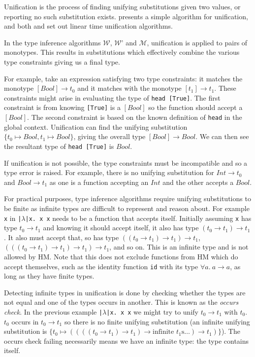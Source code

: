 \documentclass[a4paper,fleqn,oneside,12pt]{report}
\newcommand{\W}{$\mathcal{W}$}
\newcommand{\M}{$\mathcal{M}$}
\begin{document}
Unification is the process of finding unifying substitutions given two values, or reporting no such substitution exists. \cite{ref29} presents a simple algorithm for unification, and both \cite{ref30} and \cite{ref31} set out linear time unification algorithms.

In the type inference algorithms \W, \W’ and \M, unification is applied to pairs of monotypes. This results in substitutions which effectively combine the various type constraints giving us a final type.

For example, take an expression satisfying two type constraints: it matches the monotype $[Bool] \rightarrow t_0$ and it matches with the monotype $[t_1] \rightarrow t_1$. These constraints might arise in evaluating the type of \texttt{head [True]}. The first constraint is from knowing \texttt{[True]} is a $[Bool]$ so the function should accept a $[Bool]$. The second constraint is based on the known definition of \texttt{head} in the global context. Unification can find the unifying substitution $\{ t_0 \mapsto Bool, t_1 \mapsto Bool \}$, giving the overall type $[Bool] \rightarrow Bool$. We can then see the resultant type of \texttt{head [True]} is $Bool$.

If unification is not possible, the type constraints must be incompatible and so a type error is raised. For example, there is no unifying substitution for $Int \rightarrow t_0$ and $Bool \rightarrow t_1$ as one is a function accepting an $Int$ and the other accepts a $Bool$.

For practical purposes, type inference algorithms require unifying substitutions to be finite as infinite types are difficult to represent and reason about. For example \texttt{x} in \texttt{|$\lambda$|x. x x} needs to be a function that accepts itself. Initially assuming \texttt{x} has type $t_0 \rightarrow t_1$ and knowing it should accept itself, it also has type $(t_0 \rightarrow t_1) \rightarrow t_1$. It also must accept that, so has type $((t_0 \rightarrow t_1) \rightarrow t_1) \rightarrow t_1$, $(((t_0 \rightarrow t_1) \rightarrow t_1) \rightarrow t_1) \rightarrow t_1$, and so on. This is an infinite type and is not allowed by HM. Note that this does not exclude functions from HM which do accept themselves, such as the identity function \texttt{id} with its type $\forall a.\ a \rightarrow a$, as long as they have finite types.

Detecting infinite types in unification is done by checking whether the types are not equal and one of the types occurs in another. This is known as the \textit{occurs check}. In the previous example \texttt{|$\lambda$|x. x x} we might try to unify $t_0 \rightarrow t_1$ with $t_0$. $t_0$ occurs in $t_0 \rightarrow t_1$ so there is no finite unifying substitution (an infinite unifying substitution is $\{ t_0 \mapsto ((((t_0 \rightarrow t_1) \rightarrow t_1) \rightarrow \textrm{infinite }t_1\textrm{s} \dots) \rightarrow t_1) \}$). The occurs check failing necessarily means we have an infinite type: the type contains itself.
\end{document}
